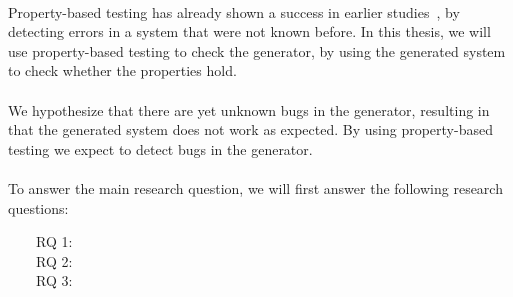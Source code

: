 \\
Property-based testing has already shown a success in earlier
studies~\cite{fink1997property,claessen2011quickcheck,arts2006testing}, by
detecting errors in a system that were not known before. In this thesis, we will
use property-based testing to check the generator, by using the generated system
to check whether the properties hold.\\
\\
We hypothesize that there are yet unknown bugs in the generator, resulting in
that the generated system does not work as expected. By using property-based
testing we expect to detect bugs in the generator.\\
\\
To answer the main research question, we will first answer the following
research questions:
\begin{description}
\item[~~~~RQ 1:] \rqOne
\item[~~~~RQ 2:] \rqTwo
\item[~~~~RQ 3:] \rqThree
\end{description}

